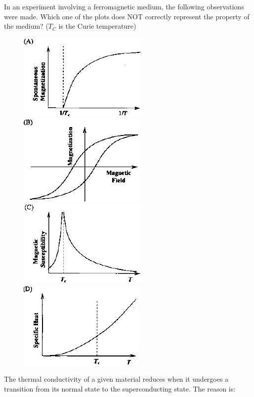 \documentclass{exam}
\begin{document}
\begin{questions}
\question In an experiment involving a ferromagnetic medium, the following observations were made. Which one of the plots does NOT correctly represent the property of the medium? ($T_C$ is the Curie temperature)\hfill{}
\begin{figure}[H]
\begin{multicols}{2}
	\centering
	\caption*{} \label{9a} \includegraphics[width=0.45\columnwidth]{pics/9a.png}
	\caption*{} \label{9b} \includegraphics[width=0.45\columnwidth]{pics/9b.png}
	\caption*{} \label{9c} \includegraphics[width=0.45\columnwidth]{pics/9c.png}
	\caption*{} \label{9d} \includegraphics[width=0.45\columnwidth]{pics/9d.png}
	\end{multicols}
\end{figure}

\question The thermal conductivity of a given material reduces when it undergoes a transition from its normal state to the superconducting state. The reason is:\hfill{}


\end{questions}
\end{document}
